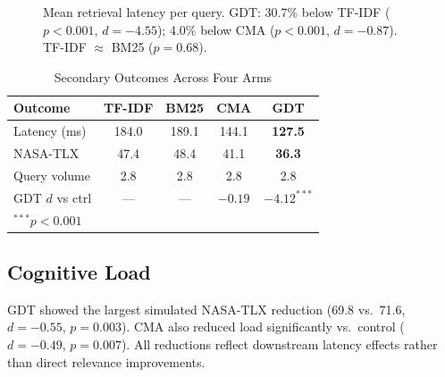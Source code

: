 \documentclass[journal,10pt,twoside]{IEEEtran}
\begin{document}
\begin{figure}[!t]
  \centering
  \caption{Mean retrieval latency per query. GDT: 30.7\% below TF-IDF ($p{<}0.001$, $d{=}{-4.55}$); 4.0\% below CMA ($p{<}0.001$, $d{=}{-0.87}$). TF-IDF $\approx$ BM25 ($p{=}0.68$).}
  \label{fig:latency}
\end{figure}

\begin{table}[!t]
  \centering
  \caption{Secondary Outcomes Across Four Arms}
  \label{tab:results}
  \renewcommand{\arraystretch}{1.15}
  \begin{tabular}{lcccc}
    \toprule
    \textbf{Outcome} & \textbf{TF-IDF} & \textbf{BM25} & \textbf{CMA} & \textbf{GDT} \\
    \midrule
    Latency (ms)   & 184.0 & 189.1 & 144.1 & \textbf{127.5} \\
    NASA-TLX       & 47.4  & 48.4  & 41.1  & \textbf{36.3}  \\
    Query volume   & 2.8   & 2.8   & 2.8   & 2.8           \\
    \midrule
    GDT $d$ vs ctrl& ---   & ---   & $-0.19$ & $-4.12^{***}$ \\
    \bottomrule
    \multicolumn{5}{l}{\footnotesize $^{***}p{<}0.001$}
  \end{tabular}
\end{table}

\subsection{Cognitive Load}

GDT showed the largest simulated NASA-TLX reduction (69.8 vs.\ 71.6, $d{=}{-0.55}$, $p{=}0.003$). CMA also reduced load significantly vs.\ control ($d{=}{-0.49}$, $p{=}0.007$). All reductions reflect downstream latency effects rather than direct relevance improvements.
\end{document}
